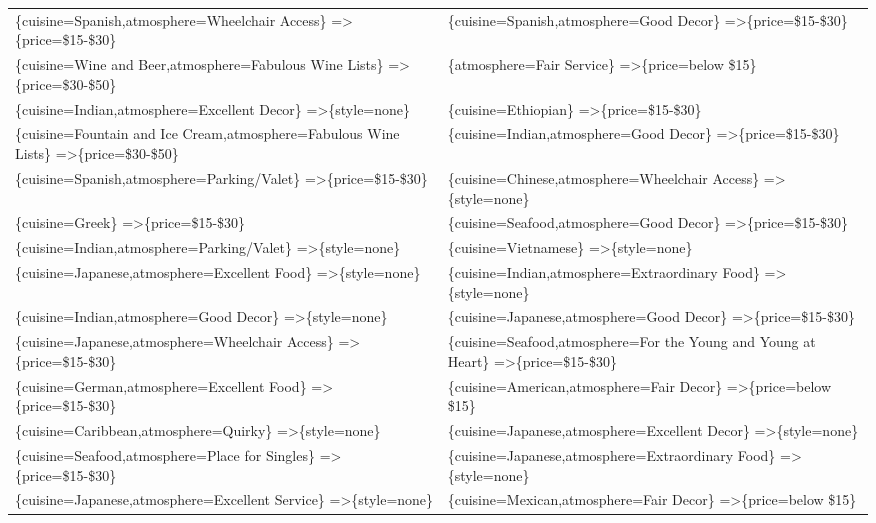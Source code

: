 \documentclass[letterpaper,10pt]{article}
\begin{document}
\begin{appendices}
\begin{table}[h]
\begin{adjustbox}{max width=\textwidth}
\begin{tabular}{ll}
\{cuisine=Spanish,atmosphere=Wheelchair Access\} =\textgreater \{price=\$15-\$30\} & \{cuisine=Spanish,atmosphere=Good Decor\} =\textgreater \{price=\$15-\$30\} \\ 
\{cuisine=Wine and Beer,atmosphere=Fabulous Wine Lists\} =\textgreater \{price=\$30-\$50\} & \{atmosphere=Fair Service\} =\textgreater \{price=below \$15\} \\ 
\{cuisine=Indian,atmosphere=Excellent Decor\} =\textgreater \{style=none\} & \{cuisine=Ethiopian\} =\textgreater \{price=\$15-\$30\} \\ 
\{cuisine=Fountain and Ice Cream,atmosphere=Fabulous Wine Lists\} =\textgreater \{price=\$30-\$50\} & \{cuisine=Indian,atmosphere=Good Decor\} =\textgreater \{price=\$15-\$30\} \\ 
\{cuisine=Spanish,atmosphere=Parking/Valet\} =\textgreater \{price=\$15-\$30\} & \{cuisine=Chinese,atmosphere=Wheelchair Access\} =\textgreater \{style=none\} \\ 
\{cuisine=Greek\} =\textgreater \{price=\$15-\$30\} & \{cuisine=Seafood,atmosphere=Good Decor\} =\textgreater \{price=\$15-\$30\} \\ 
\{cuisine=Indian,atmosphere=Parking/Valet\} =\textgreater \{style=none\} & \{cuisine=Vietnamese\} =\textgreater \{style=none\} \\ 
\{cuisine=Japanese,atmosphere=Excellent Food\} =\textgreater \{style=none\} & \{cuisine=Indian,atmosphere=Extraordinary Food\} =\textgreater \{style=none\} \\ 
\{cuisine=Indian,atmosphere=Good Decor\} =\textgreater \{style=none\} & \{cuisine=Japanese,atmosphere=Good Decor\} =\textgreater \{price=\$15-\$30\} \\ 
\{cuisine=Japanese,atmosphere=Wheelchair Access\} =\textgreater \{price=\$15-\$30\} & \{cuisine=Seafood,atmosphere=For the Young and Young at Heart\} =\textgreater \{price=\$15-\$30\} \\ 
\{cuisine=German,atmosphere=Excellent Food\} =\textgreater \{price=\$15-\$30\} & \{cuisine=American,atmosphere=Fair Decor\} =\textgreater \{price=below \$15\} \\ 
\{cuisine=Caribbean,atmosphere=Quirky\} =\textgreater \{style=none\} & \{cuisine=Japanese,atmosphere=Excellent Decor\} =\textgreater \{style=none\} \\ 
\{cuisine=Seafood,atmosphere=Place for Singles\} =\textgreater \{price=\$15-\$30\} & \{cuisine=Japanese,atmosphere=Extraordinary Food\} =\textgreater \{style=none\} \\ 
\{cuisine=Japanese,atmosphere=Excellent Service\} =\textgreater \{style=none\} & \{cuisine=Mexican,atmosphere=Fair Decor\} =\textgreater \{price=below \$15\} \\ 

\end{tabular}
\end{adjustbox}
\end{table}
\end{appendices}
\end{document}

